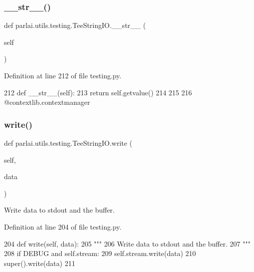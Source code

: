 \subsubsection{\texorpdfstring{\+\_\+\+\_\+str\+\_\+\+\_\+()}{\_\_str\_\_()}}
{\footnotesize\ttfamily def parlai.\+utils.\+testing.\+Tee\+String\+I\+O.\+\_\+\+\_\+str\+\_\+\+\_\+ (\begin{DoxyParamCaption}\item[{}]{self }\end{DoxyParamCaption})}



Definition at line 212 of file testing.\+py.


\begin{DoxyCode}
212     \textcolor{keyword}{def }\_\_str\_\_(self):
213         \textcolor{keywordflow}{return} self.getvalue()
214 
215 
216 @contextlib.contextmanager
\end{DoxyCode}
\mbox{\label{classparlai_1_1utils_1_1testing_1_1TeeStringIO_af8c256be884cbcb0081768bc04738015}} 
\subsubsection{\texorpdfstring{write()}{write()}}
{\footnotesize\ttfamily def parlai.\+utils.\+testing.\+Tee\+String\+I\+O.\+write (\begin{DoxyParamCaption}\item[{}]{self,  }\item[{}]{data }\end{DoxyParamCaption})}

\begin{DoxyVerb}Write data to stdout and the buffer.
\end{DoxyVerb}
 

Definition at line 204 of file testing.\+py.


\begin{DoxyCode}
204     \textcolor{keyword}{def }write(self, data):
205         \textcolor{stringliteral}{"""}
206 \textcolor{stringliteral}{        Write data to stdout and the buffer.}
207 \textcolor{stringliteral}{        """}
208         \textcolor{keywordflow}{if} DEBUG \textcolor{keywordflow}{and} self.stream:
209             self.stream.write(data)
210         super().write(data)
211 
\end{DoxyCode}


